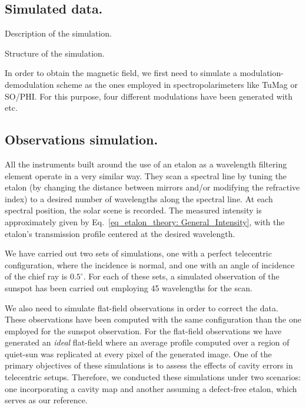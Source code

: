 \subsection{\label{sect: mancha_sim_data}Simulated data.}

Description of the simulation. 

Structure of the simulation.

In order to obtain the magnetic field, we first need to simulate a modulation-demodulation scheme as the ones employed in spectropolarimeters like TuMag or SO/PHI. For this purpose, four different modulations have been generated with etc. 

\subsection{\label{sect: mancha_obs_sim}Observations simulation.}

All the instruments built around the use of an etalon as a wavelength filtering element operate in a very similar way. They scan a spectral line by tuning the etalon (by changing the distance between mirrors and/or modifying the refractive index) to a desired number of wavelengths along the spectral line. At each spectral position, the solar scene is recorded. The measured intensity is approximately given by Eq.~\eqref{eq_etalon_theory: General_Intensity}, with the etalon's transmission profile centered at the desired wavelength.

We have carried out two sets of simulations, one with a perfect telecentric configuration, where the incidence is normal, and one with an angle of incidence of the chief ray is $0.5^\circ$. For each of these sets, a simulated observation of the sunspot has been carried out employing 45 wavelengths for the scan.

We also need to simulate flat-field observations in order to correct the data. These observations have been computed with the same configuration than the one employed for the sunspot observation. For the flat-field observations we have generated an \textit{ideal} flat-field where an average profile computed over a region of quiet-sun was replicated at every pixel of the generated image. One of the primary objectives of these simulations is to assess the effects of cavity errors in telecentric setups. Therefore, we conducted these simulations under two scenarios: one incorporating a cavity map and another assuming a defect-free etalon, which serves as our reference.  

